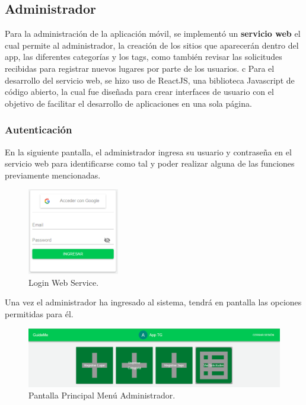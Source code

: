 \documentclass[12pt,letterpaper,openany]{book}
\begin{document}
\subsection{Administrador}
Para la administración de la aplicación móvil, se implementó un \textbf{servicio web} el cual permite al administrador, la creación de los sitios que aparecerán dentro del app, las diferentes categorías y los tags, como también revisar las solicitudes recibidas para registrar nuevos lugares por parte de los usuarios.
c
Para el desarrollo del servicio web, se hizo uso de ReactJS, una biblioteca Javascript de código abierto, la cual fue diseñada para crear interfaces de usuario con el objetivo de facilitar el desarrollo de aplicaciones en una sola página.

\subsubsection{Autenticación}
En la siguiente pantalla, el administrador ingresa su usuario y contraseña en el servicio web para identificarse como tal y poder realizar alguna de las funciones previamente mencionadas.

\begin{figure}[H]
\begin{center}
\includegraphics[width=4cm]{./imagenes/admin/login}
\caption{Login Web Service.}
\end{center}
\end{figure}

Una vez el administrador ha ingresado al sistema, tendrá en pantalla las opciones permitidas para él.

\begin{figure}[H]
\begin{center}
\includegraphics[width=13cm]{./imagenes/admin/p_principal}
\caption{Pantalla Principal Menú Administrador.}
\end{center}
\end{figure}
\end{document}
